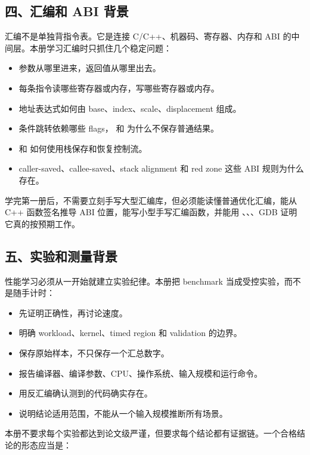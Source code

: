 \subsection*{四、汇编和 ABI 背景}

汇编不是单独背指令表。它是连接 C/C++、机器码、寄存器、内存和 ABI 的中间层。本册学习汇编时只抓住几个稳定问题：

\begin{itemize}
  \item 参数从哪里进来，返回值从哪里出去。
  \item 每条指令读哪些寄存器或内存，写哪些寄存器或内存。
  \item 地址表达式如何由 base、index、scale、displacement 组成。
  \item 条件跳转依赖哪些 flags， 和  为什么不保存普通结果。
  \item {} 和  如何使用栈保存和恢复控制流。
  \item caller-saved、callee-saved、stack alignment 和 red zone 这些 ABI 规则为什么存在。
\end{itemize}

学完第一册后，不需要立刻手写大型汇编库，但必须能读懂普通优化汇编，能从 C++ 函数签名推导 ABI 位置，能写小型手写汇编函数，并能用 、、、GDB 证明它真的按预期工作。

\subsection*{五、实验和测量背景}

性能学习必须从一开始就建立实验纪律。本册把 benchmark 当成受控实验，而不是随手计时：

\begin{itemize}
  \item 先证明正确性，再讨论速度。
  \item 明确 workload、kernel、timed region 和 validation 的边界。
  \item 保存原始样本，不只保存一个汇总数字。
  \item 报告编译器、编译参数、CPU、操作系统、输入规模和运行命令。
  \item 用反汇编确认测到的代码确实存在。
  \item 说明结论适用范围，不能从一个输入规模推断所有场景。
\end{itemize}

本册不要求每个实验都达到论文级严谨，但要求每个结论都有证据链。一个合格结论的形态应当是：

